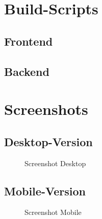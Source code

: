 \begin{appendices}
\section{Build-Scripts}
\subsection{Frontend}

\subsection{Backend}


\section{Screenshots}
\subsection{Desktop-Version}
\begin{figure}[h]
\caption{Screenshot Desktop}
\end{figure}

\subsection{Mobile-Version}
\begin{figure}[h]
\caption{Screenshot Mobile}
\end{figure}

\end{appendices}

